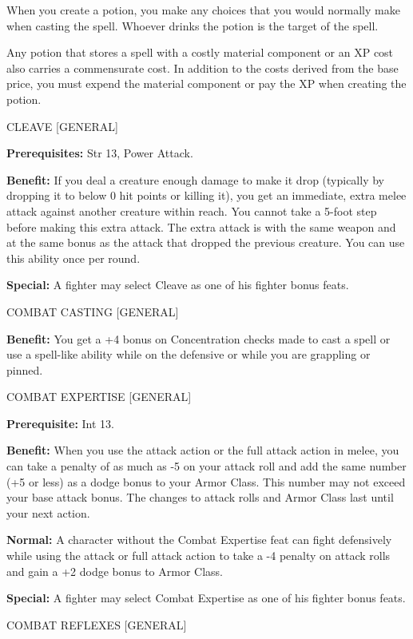 \documentclass{article}
\begin{document}
When you create a potion, you make any choices that you would normally make when 
casting the spell. Whoever drinks the potion is the target of the spell.

Any potion that stores a spell with a costly material component or an XP cost also 
carries a commensurate cost. In addition to the costs derived from the base price, 
you must expend the material component or pay the XP when creating the potion.

\vspace{12pt}
CLEAVE [GENERAL]

\textbf{Prerequisites:} Str 13, Power Attack.

\textbf{Benefit:} If you deal a creature enough damage to make it drop (typically 
by dropping it to below 0 hit points or killing it), you get an immediate, extra 
melee attack against another creature within reach. You cannot take a 5-foot step 
before making this extra attack. The extra attack is with the same weapon and at 
the same bonus as the attack that dropped the previous creature. You can use this 
ability once per round.

\textbf{Special:} A fighter may select Cleave as one of his fighter bonus feats.

\vspace{12pt}
COMBAT CASTING [GENERAL]

\textbf{Benefit:} You get a +4 bonus on Concentration checks made to cast a spell 
or use a spell-like ability while on the defensive or while you are grappling or 
pinned.

\vspace{12pt}
COMBAT EXPERTISE [GENERAL]

\textbf{Prerequisite:} Int 13.

\textbf{Benefit:} When you use the attack action or the full attack action in melee, 
you can take a penalty of as much as -5 on your attack roll and add the same number 
(+5 or less) as a dodge bonus to your Armor Class. This number may not exceed your 
base attack bonus. The changes to attack rolls and Armor Class last until your 
next action.

\textbf{Normal:} A character without the Combat Expertise feat can fight defensively 
while using the attack or full attack action to take a -4 penalty on attack rolls 
and gain a +2 dodge bonus to Armor Class.

\textbf{Special:} A fighter may select Combat Expertise as one of his fighter bonus 
feats.

\vspace{12pt}
COMBAT REFLEXES [GENERAL]
\end{document}
